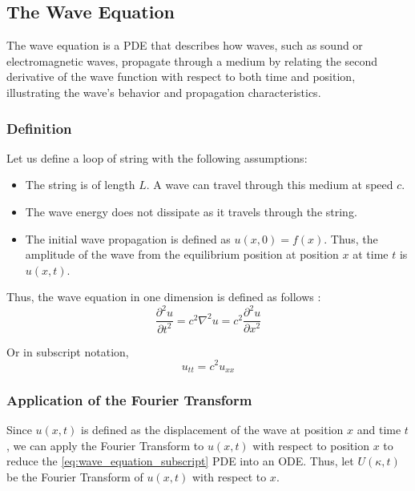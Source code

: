 \subsection{The Wave Equation}
The wave equation is a PDE that describes how waves, such as sound or electromagnetic waves, propagate through a medium by relating the second derivative of the wave function with respect to both time and position, illustrating the wave's behavior and propagation characteristics.

\subsubsection{Definition}
\noindent
Let us define a loop of string with the following assumptions:
\begin{itemize}
    \item The string is of length \(L\). A wave can travel through this medium at speed \(c\).
    \item The wave energy does not dissipate as it travels through the string.
    \item The initial wave propagation is defined as \(u(x,0) = f(x)\). Thus, the amplitude of the wave from the equilibrium position at position \(x\) at time \(t\) is \(u(x,t)\).
\end{itemize}

\noindent
Thus, the wave equation in one dimension is defined as follows \citep{Libretexts_2022b}:
\begin{equation} \label{eq:wave_equation}
    \frac{\partial^2 u}{\partial t^2} = c^2 \nabla^2 u = c^2 \frac{\partial^2 u}{\partial x^2}
\end{equation}

\noindent
Or in subscript notation,
\begin{equation} \label{eq:wave_equation_subscript}
    u_{tt} = c^2 u_{xx}
\end{equation}

\subsubsection{Application of the Fourier Transform}
Since \(u(x,t)\) is defined as the displacement of the wave at position \(x\) and time \(t\), we can apply the Fourier Transform to \(u(x,t)\) with respect to position \(x\) to reduce the \cref{eq:wave_equation_subscript} PDE into an ODE. Thus, let \(U(\kappa,t)\) be the Fourier Transform of \(u(x,t)\) with respect to \(x\).

